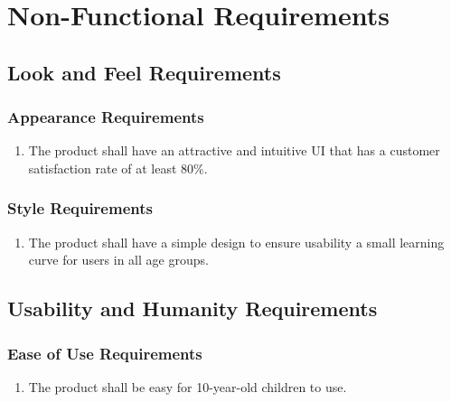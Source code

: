 \documentclass[]{article}
\begin{document}

\section{Non-Functional Requirements}
\label{sec:non-functional_requirements}
\subsection{Look and Feel Requirements}
\label{sub:look_and_feel_requirements}

\subsubsection{Appearance Requirements}
\label{ssub:appearance_requirements}
\begin{enumerate}[{LF}1. ]
	\item The product shall have an attractive and intuitive UI that has a customer satisfaction rate of at least 80\%.
\end{enumerate}

\subsubsection{Style Requirements}
\label{ssub:style_requirements}
\begin{enumerate}[{LF}2. ]
	\item The product shall have a simple design to ensure usability a small learning curve for users in all age groups.
\end{enumerate}


\subsection{Usability and Humanity Requirements}
\label{sub:usability_and_humanity_requirements}

\subsubsection{Ease of Use Requirements}
\label{ssub:ease_of_use_requirements}
\begin{enumerate}[{UH}1. ]
	\item The product shall be easy for 10-year-old children to use.
\end{enumerate}
\end{document}
